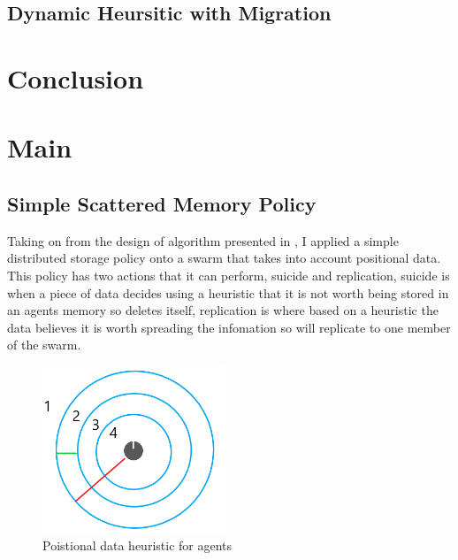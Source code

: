 \documentclass{UoYCSproject}
\begin{document}
\section{Dynamic Heursitic with Migration}
\label{sec:Simple4a}



\chapter{Conclusion}
\label{cha:conclusion}






\chapter{Main}
\label{cha:Main}



\section{Simple Scattered Memory Policy}
\label{sec:Simple1}

Taking on from the design of algorithm presented in \cite{Distributed Storage}, I applied a simple distributed storage policy onto a swarm that takes into account positional data.
This policy has two actions that it can perform, suicide and replication, suicide is when a piece of data decides using a heuristic that it is not worth being stored in an agents memory so deletes itself, replication is where based on a heuristic the data believes it is worth spreading the infomation so will replicate to one member of the swarm.

\begin{figure}[htb]
\label{fig:Heuristic}
\begin{center}
\centering
\includegraphics[height=5cm]{"./ExplanationImgs/Heuristic.png"}
\caption{Poistional data heuristic for agents}
\end{center}
\end{figure}
\end{document}
